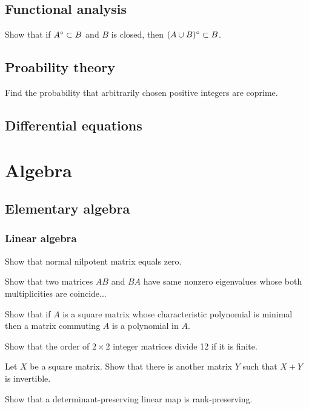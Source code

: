 \documentclass[11pt]{report}
\let\realsection\section
\renewcommand\section{\realsection}
\begin{document}
\section{Functional analysis}
\begin{cond}
\item Show that if $A^\o\subset B$ and $B$ is closed, then $(A\cup B)^\o\subset B$.
\end{cond}

\section{Proability theory}
\begin{cond}
\item Find the probability that arbitrarily chosen positive integers are coprime.
\end{cond}

\section{Differential equations}












\chapter{Algebra}

\section{Elementary algebra}

\subsection{Linear algebra}
\begin{cond}
\item Show that normal nilpotent matrix equals zero.
\item Show that two matrices $AB$ and $BA$ have same nonzero eigenvalues whose both multiplicities are coincide...
\item Show that if $A$ is a square matrix whose characteristic polynomial is minimal then a matrix commuting $A$ is a polynomial in $A$.
\item Show that the order of $2\times 2$ integer matrices divide 12 if it is finite.
\item Let $X$ be a square matrix. Show that there is another matrix $Y$ such that $X+Y$ is invertible.
\item Show that a determinant-preserving linear map is rank-preserving.
\end{cond}
\end{document}

